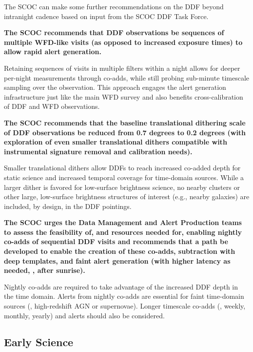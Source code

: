 The SCOC can make some further recommendations on the DDF beyond intranight cadence based on input from the SCOC DDF Task Force.

{\bf The SCOC recommends that DDF observations be sequences of multiple WFD-like visits (as opposed to increased exposure times) to allow rapid alert generation.} 

Retaining sequences of visits in multiple filters within a night allows for deeper per-night measurements through co-adds, while still probing sub-minute timescale sampling over the observation. This approach engages the alert generation infrastructure just like the main WFD survey and also benefits cross-calibration of DDF and WFD observations. 

{\bf The SCOC recommends that the baseline translational dithering scale of DDF observations be reduced from 0.7 degrees to 0.2 degrees (with exploration of even smaller translational dithers compatible with instrumental signature removal and calibration needs).
}

Smaller translational dithers allow DDFs to reach increased co-added depth for static science and increased temporal coverage for time-domain sources. While a larger dither is favored for low-surface brightness science, no nearby clusters or other large, low-surface brightness structures of interest (e.g., nearby galaxies) are included, by design, in the DDF pointings.



{\bf The SCOC urges the Data Management and Alert Production teams to assess the feasibility of, and resources needed for, enabling nightly co-adds of sequential DDF visits and recommends that a path be developed to enable the creation of these co-adds, subtraction with deep templates, and faint alert generation (with higher latency as needed, \eg , after sunrise). 
}

Nightly co-adds are required to take advantage of the increased DDF depth in the time domain. Alerts from nightly co-adds are essential for faint time-domain sources (\eg , high-redshift AGN or supernovae). Longer timescale co-adds (\eg , weekly, monthly, yearly) and alerts should also be considered.





\FloatBarrier

\subsection{Early Science}\label{sec:early}

